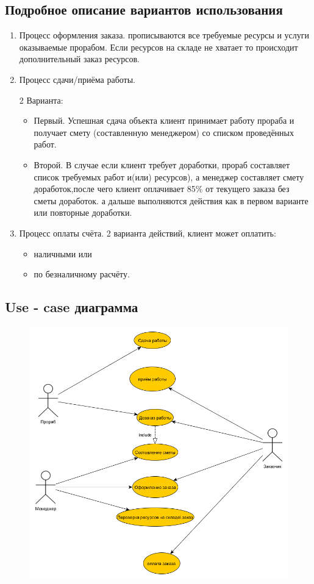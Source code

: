 \documentclass[12pt,a4paper,titlepage]{article}
\begin{document}
\subsection{Подробное описание вариантов использования}
\begin{enumerate}
\item
Процесс оформления заказа. прописываются все требуемые ресурсы и услуги оказываемые прорабом. Если ресурсов на складе не хватает то происходит дополнительный заказ ресурсов.
\item
Процесс сдачи/приёма работы.

2 Варианта:
\begin{itemize}
\item Первый. Успешная сдача объекта клиент принимает работу прораба и получает смету (составленную менеджером) со списком проведённых работ.
\item Второй. В случае если клиент требует доработки, прораб составляет список требуемых работ и(или) ресурсов), а менеджер составляет смету доработок,после чего клиент оплачивает 85\% от текущего заказа без сметы доработок. а дальше выполняются действия как в первом варианте или повторные доработки.
\end{itemize}
\item
Процесс оплаты счёта. 2 варианта действий, клиент может оплатить:
	\begin{itemize}
		\item наличными или
		\item по безналичному расчёту.
	\end{itemize}
\end{enumerate}
\newpage
\subsection{Use - case диаграмма}
\begin{figure}[!ht]
\includegraphics[scale=0.5]{images/uml_use_case.png}\caption{}
\end{figure}
\newpage
\end{document}
